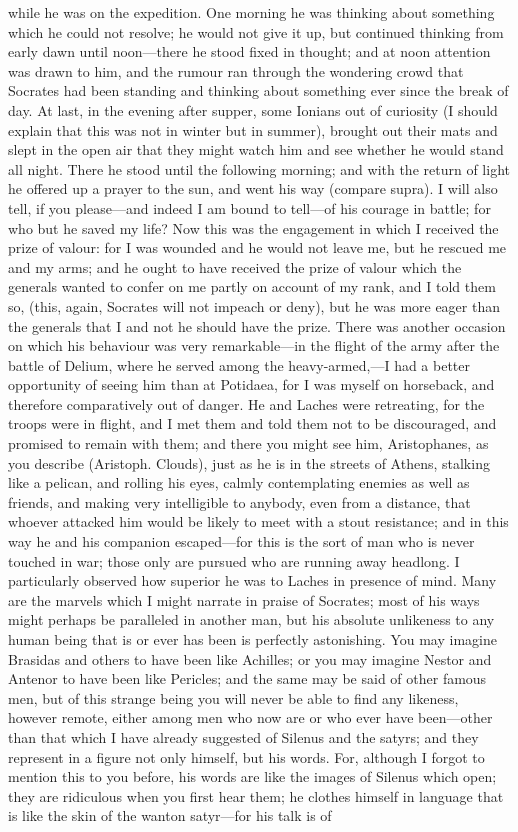 \documentclass[11pt,letter]{article}
\begin{document}
\par  while he was on the expedition. One morning he was thinking about something which he could not resolve; he would not give it up, but continued thinking from early dawn until noon—there he stood fixed in thought; and at noon attention was drawn to him, and the rumour ran through the wondering crowd that Socrates had been standing and thinking about something ever since the break of day. At last, in the evening after supper, some Ionians out of curiosity (I should explain that this was not in winter but in summer), brought out their mats and slept in the open air that they might watch him and see whether he would stand all night. There he stood until the following morning; and with the return of light he offered up a prayer to the sun, and went his way (compare supra). I will also tell, if you please—and indeed I am bound to tell—of his courage in battle; for who but he saved my life? Now this was the engagement in which I received the prize of valour: for I was wounded and he would not leave me, but he rescued me and my arms; and he ought to have received the prize of valour which the generals wanted to confer on me partly on account of my rank, and I told them so, (this, again, Socrates will not impeach or deny), but he was more eager than the generals that I and not he should have the prize. There was another occasion on which his behaviour was very remarkable—in the flight of the army after the battle of Delium, where he served among the heavy-armed,—I had a better opportunity of seeing him than at Potidaea, for I was myself on horseback, and therefore comparatively out of danger. He and Laches were retreating, for the troops were in flight, and I met them and told them not to be discouraged, and promised to remain with them; and there you might see him, Aristophanes, as you describe (Aristoph. Clouds), just as he is in the streets of Athens, stalking like a pelican, and rolling his eyes, calmly contemplating enemies as well as friends, and making very intelligible to anybody, even from a distance, that whoever attacked him would be likely to meet with a stout resistance; and in this way he and his companion escaped—for this is the sort of man who is never touched in war; those only are pursued who are running away headlong. I particularly observed how superior he was to Laches in presence of mind. Many are the marvels which I might narrate in praise of Socrates; most of his ways might perhaps be paralleled in another man, but his absolute unlikeness to any human being that is or ever has been is perfectly astonishing. You may imagine Brasidas and others to have been like Achilles; or you may imagine Nestor and Antenor to have been like Pericles; and the same may be said of other famous men, but of this strange being you will never be able to find any likeness, however remote, either among men who now are or who ever have been—other than that which I have already suggested of Silenus and the satyrs; and they represent in a figure not only himself, but his words. For, although I forgot to mention this to you before, his words are like the images of Silenus which open; they are ridiculous when you first hear them; he clothes himself in language that is like the skin of the wanton satyr—for his talk is of 
\end{document}
